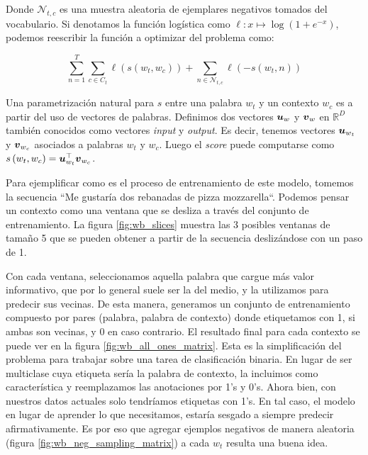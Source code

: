 Donde $\mathcal{N}_{t, c}$ es una muestra aleatoria de ejemplares negativos
tomados del vocabulario. Si denotamos la función logística como $\ell: x \mapsto
\log \left(1 + e^{-x} \right)$, podemos reescribir la función a optimizar del
problema como:

\begin{equation}
    \sum_{n=1}^{T} 
        \sum_{c \in C_t} \ell\left(s(w_t, w_c)\right) +
        \sum_{n \in \mathcal{N}_{t, c}} \ell\left(-s(w_t, n) \right)
\end{equation}

Una parametrización natural para $s$ entre una palabra $w_t$ y un contexto $w_c$
es a partir del uso de vectores de palabras. Definimos dos vectores $\boldsymbol{u}_w$
y $\boldsymbol{v}_w$ en $\mathbb{R}^D$ también conocidos como vectores \emph{input} y
\emph{output}. Es decir, tenemos vectores $\boldsymbol{u}_{w_t}$ y $\boldsymbol{v}_{w_c}$
asociados a palabras $w_t$ y $w_c$. Luego el \emph{score} puede computarse como
$s\left( w_t, w_c \right) = \boldsymbol{u}_{w_t}^\top \boldsymbol{v}_{w_c}$.

Para ejemplificar como es el proceso de entrenamiento de este modelo, tomemos la
secuencia ``Me gustaría dos rebanadas de pizza mozzarella``. Podemos pensar un
contexto como una ventana que se desliza a través del conjunto de entrenamiento.
La figura \ref{fig:wb_slices} muestra las 3 posibles ventanas de tamaño 5 que se
pueden obtener a partir de la secuencia deslizándose con un paso de 1.

Con cada ventana, seleccionamos aquella palabra que cargue más valor
informativo, que por lo general suele ser la del medio, y la utilizamos para
predecir sus vecinas. De esta manera, generamos un conjunto de entrenamiento
compuesto por pares (palabra, palabra de contexto) donde etiquetamos con 1, si
ambas son vecinas, y 0 en caso contrario. El resultado final para cada contexto
se puede ver en la figura \ref{fig:wb_all_ones_matrix}. Esta es la
simplificación del problema para trabajar sobre una tarea de clasificación
binaria. En lugar de ser multiclase cuya etiqueta sería la palabra de contexto,
la incluimos como característica y reemplazamos las anotaciones por 1's y 0's.
Ahora bien, con nuestros datos actuales solo tendríamos etiquetas con 1's. En
tal caso, el modelo en lugar de aprender lo que necesitamos, estaría sesgado a
siempre predecir afirmativamente. Es por eso que agregar ejemplos negativos de
manera aleatoria (figura \ref{fig:wb_neg_sampling_matrix}) a cada $w_t$ resulta
una buena idea.

